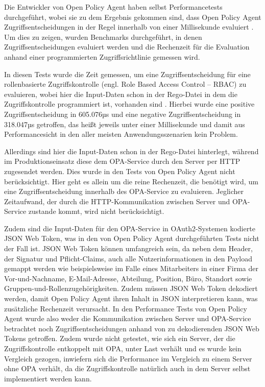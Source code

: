 Die Entwickler von Open Policy Agent haben selbst Performancetests durchgeführt, wobei sie zu dem Ergebnis gekommen sind, dass Open Policy Agent Zugriffsentscheidungen in der Regel innerhalb von einer Millisekunde evaluiert \citep{opaperformance:2021:07}. Um dies zu zeigen, wurden Benchmarks durchgeführt, in denen Zugriffsentscheidungen evaluiert werden und die Rechenzeit für die Evaluation anhand einer programmierten Zugriffsrichtlinie gemessen wird.\smallskip

In diesen Tests wurde die Zeit gemessen, um eine Zugriffsentscheidung für eine rollenbasierte Zugriffskontrolle (engl. Role Based Access Control – RBAC) zu evaluieren, wobei hier die Input-Daten schon in der Rego-Datei in dem die Zugriffskontrolle programmiert ist, vorhanden sind \citep{oparbacperformance:2021}. Hierbei wurde eine positive Zugriffsentscheidung in 605.076µs und eine negative Zugriffsentscheidung in 318.047µs getroffen, das heißt jeweils unter einer Millisekunde und damit aus Performancesicht in den aller meisten Anwendungsszenarien kein Problem.\smallskip

Allerdings sind hier die Input-Daten schon in der Rego-Datei hinterlegt, während im Produktionseinsatz diese dem OPA-Service durch den Server per HTTP zugesendet werden. Dies wurde in den Tests von Open Policy Agent nicht berücksichtigt. Hier geht es allein um die reine Rechenzeit, die benötigt wird, um eine Zugriffsentscheidung innerhalb des OPA-Service zu evaluieren. Jeglicher Zeitaufwand, der durch die HTTP-Kommunikation zwischen Server und OPA-Service zustande kommt, wird nicht berücksichtigt.\smallskip

Zudem sind die Input-Daten für den OPA-Service in OAuth2-Systemen kodierte JSON Web Token, was in den von Open Policy Agent durchgeführten Tests nicht der Fall ist. JSON Web Token können umfangreich sein, da neben dem Header, der Signatur und Pflicht-Claims, auch alle Nutzerinformationen in den Payload gemappt werden wie beispielsweise im Falle eines Mitarbeiters in einer Firma der Vor-und-Nachname, E-Mail-Adresse, Abteilung, Position, Büro, Standort sowie Gruppen-und-Rollenzugehörigkeiten. Zudem müssen JSON Web Token dekodiert werden, damit Open Policy Agent ihren Inhalt in JSON interpretieren kann, was zusätzliche Rechenzeit verursacht. 
In den Performance Tests von Open Policy Agent wurde also weder die Kommunikation zwischen Server und OPA-Service betrachtet noch Zugriffsentscheidungen anhand von zu dekodierenden JSON Web Tokens getroffen. Zudem wurde nicht getestet, wie sich ein Server, der die Zugriffskontrolle entkoppelt mit OPA, unter Last verhält und es wurde kein Vergleich gezogen, inwiefern sich die Performance im Vergleich zu einem Server ohne OPA verhält, da die Zugriffskontrolle natürlich auch in dem Server selbst implementiert werden kann. 
